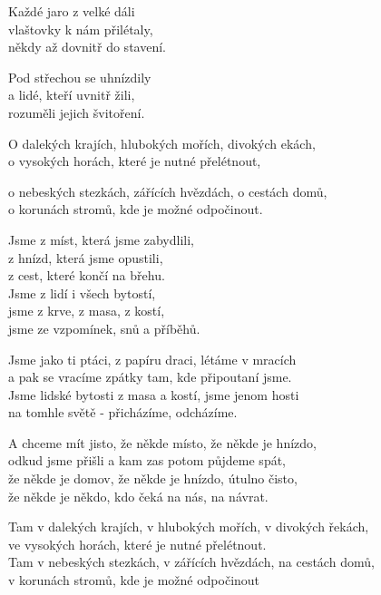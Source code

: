 
\ve{}
Každé jaro z velké dáli\\
vlaštovky k nám přilétaly,\\
někdy až dovnitř do stavení. 

Pod střechou se uhnízdily\\
a lidé, kteří uvnitř žili,\\
rozuměli jejich švitoření.

\ve{}
O dalekých krajích, hlubokých mořích, divokých ekách,\\
o vysokých horách, které je nutné přelétnout,

o nebeských stezkách, zářících hvězdách, o cestách domů,\\
o korunách stromů, kde je možné odpočinout.

\ve{}
Jsme z míst, která jsme zabydlili,\\
z hnízd, která jsme opustili,\\
z cest, které končí na břehu.\\
Jsme z lidí i všech bytostí,\\
jsme z krve, z masa, z kostí,\\
jsme ze vzpomínek, snů a příběhů.

\ve{}
Jsme jako ti ptáci, z papíru draci, létáme v mracích\\
a pak se vracíme zpátky tam, kde připoutaní jsme.\\
Jsme lidské bytosti z masa a kostí, jsme jenom hosti\\
na tomhle světě - přicházíme, odcházíme. 

\ve{}
A chceme mít jisto, že někde místo, že někde je hnízdo,\\
odkud jsme přišli a kam zas potom půjdeme spát,\\
že někde je domov, že někde je hnízdo, útulno čisto,\\
že někde je někdo, kdo čeká na nás, na návrat. 

\ve{}
Tam v dalekých krajích, v hlubokých mořích, v divokých řekách,\\
ve vysokých horách, které je nutné přelétnout.\\
Tam v nebeských stezkách, v zářících hvězdách, na cestách domů,\\
v korunách stromů, kde je možné odpočinout 

\esong{}